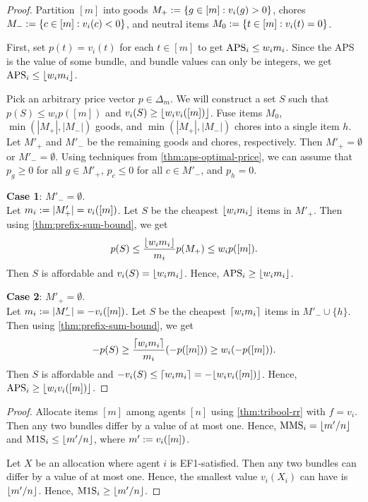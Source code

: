 \begin{proof}
Partition $[m]$ into goods $M_+ := \{g \in [m]: v_i(g) > 0\}$,
chores $M_- := \{c \in [m]: v_i(c) < 0\}$, and
neutral items $M_0 := \{t \in [m]: v_i(t) = 0\}$.

First, set $p(t) = v_i(t)$ for each $t \in [m]$ to get $\mathrm{APS}_i \le w_im_i$.
Since the APS is the value of some bundle, and bundle values can only be integers,
we get $\mathrm{APS}_i \le \lfloor w_im_i \rfloor$.

Pick an arbitrary price vector $p \in \Delta_m$.
We will construct a set $S$ such that $p(S) \le w_ip([m])$ and $v_i(S) \ge \lfloor w_iv_i([m]) \rfloor$.
Fuse items $M_0$, $\min(|M_+|, |M_-|)$ goods, and $\min(|M_+|, |M_-|)$ chores
into a single item $h$.
Let $M'_+$ and $M'_-$ be the remaining goods and chores, respectively.
Then $M'_+ = \emptyset$ or $M'_- = \emptyset$.
Using techniques from \cref{thm:aps-optimal-price},
we can assume \wLoG{} that $p_g \ge 0$ for all $g \in M'_+$,
$p_c \le 0$ for all $c \in M'_-$, and $p_h = 0$.

\textbf{Case 1}: $M'_- = \emptyset$.
\\ Let $m_i := |M'_+| = v_i([m])$.
Let $S$ be the cheapest $\lfloor w_im_i \rfloor$ items in $M'_+$.
Then using \cref{thm:prefix-sum-bound}, we get
\[ p(S) \le \frac{\lfloor w_im_i \rfloor}{m_i}p(M_+) \le w_ip([m]). \]
Then $S$ is affordable and $v_i(S) = \lfloor w_im_i \rfloor$.
Hence, $\mathrm{APS}_i \ge \lfloor w_im_i \rfloor$.

\textbf{Case 2}: $M'_+ = \emptyset$.
\\ Let $m_i := |M'_-| = -v_i([m])$.
Let $S$ be the cheapest $\lceil w_im_i \rceil$ items in $M'_- \cup \{h\}$.
Then using \cref{thm:prefix-sum-bound}, we get
\[ -p(S) \ge \frac{\lceil w_im_i \rceil}{m_i}(-p([m])) \ge w_i(-p([m])). \]
Then $S$ is affordable and $-v_i(S) \le \lceil w_im_i \rceil = -\lfloor w_iv_i([m]) \rfloor$.
Hence, $\mathrm{APS}_i \ge \lfloor w_iv_i([m]) \rfloor$.
\end{proof}

\begin{proof}
Allocate items $[m]$ among agents $[n]$ using \cref{thm:tribool-rr} with $f = v_i$.
Then any two bundles differ by a value of at most one.
Hence, $\mathrm{MMS}_i = \lfloor m'/n \rfloor$ and $\mathrm{M1S}_i \le \lfloor m'/n \rfloor$,
where $m' := v_i([m])$.

Let $X$ be an allocation where agent $i$ is EF1-satisfied.
Then any two bundles can differ by a value of at most one.
Hence, the smallest value $v_i(X_i)$ can have is $\lfloor m'/n \rfloor$.
Hence, $\mathrm{M1S}_i \ge \lfloor m'/n \rfloor$.
\end{proof}

